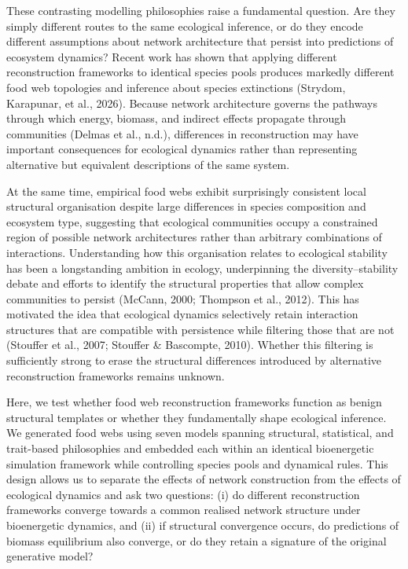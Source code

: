 \documentclass[
]{article}
\begin{document}
These contrasting modelling philosophies raise a fundamental question.
Are they simply different routes to the same ecological inference, or do
they encode different assumptions about network architecture that
persist into predictions of ecosystem dynamics? Recent work has shown
that applying different reconstruction frameworks to identical species
pools produces markedly different food web topologies and inference
about species extinctions (Strydom, Karapunar, et al., 2026). Because
network architecture governs the pathways through which energy, biomass,
and indirect effects propagate through communities (Delmas et al.,
n.d.), differences in reconstruction may have important consequences for
ecological dynamics rather than representing alternative but equivalent
descriptions of the same system.

At the same time, empirical food webs exhibit surprisingly consistent
local structural organisation despite large differences in species
composition and ecosystem type, suggesting that ecological communities
occupy a constrained region of possible network architectures rather
than arbitrary combinations of interactions. Understanding how this
organisation relates to ecological stability has been a longstanding
ambition in ecology, underpinning the diversity--stability debate and
efforts to identify the structural properties that allow complex
communities to persist (McCann, 2000; Thompson et al., 2012). This has
motivated the idea that ecological dynamics selectively retain
interaction structures that are compatible with persistence while
filtering those that are not (Stouffer et al., 2007; Stouffer \&
Bascompte, 2010). Whether this filtering is sufficiently strong to erase
the structural differences introduced by alternative reconstruction
frameworks remains unknown.

Here, we test whether food web reconstruction frameworks function as
benign structural templates or whether they fundamentally shape
ecological inference. We generated food webs using seven models spanning
structural, statistical, and trait-based philosophies and embedded each
within an identical bioenergetic simulation framework while controlling
species pools and dynamical rules. This design allows us to separate the
effects of network construction from the effects of ecological dynamics
and ask two questions: (i) do different reconstruction frameworks
converge towards a common realised network structure under bioenergetic
dynamics, and (ii) if structural convergence occurs, do predictions of
biomass equilibrium also converge, or do they retain a signature of the
original generative model?
\end{document}
